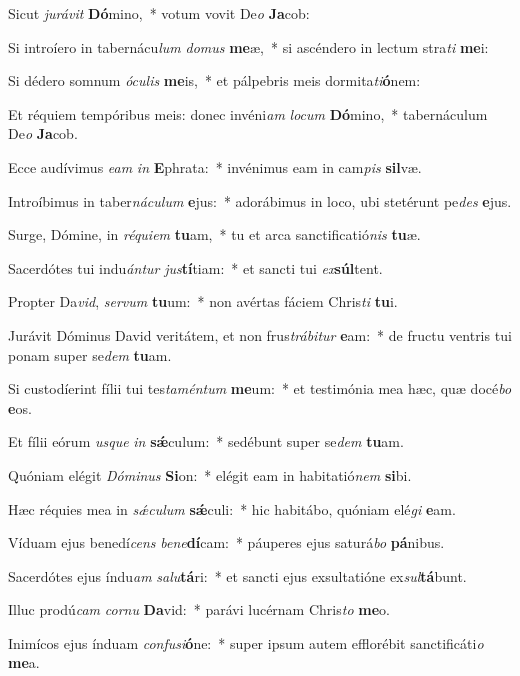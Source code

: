 \item Sicut \textit{ju}\textit{rá}\textit{vit} \textbf{Dó}mino,~* votum vovit De\textit{o} \textbf{Ja}cob:
\item Si introíero in tabernácu\textit{lum} \textit{do}\textit{mus} \textbf{me}æ,~* si ascéndero in lectum stra\textit{ti} \textbf{me}i:
\item Si dédero somnum \textit{ó}\textit{cu}\textit{lis} \textbf{me}is,~* et pálpebris meis dormita\textit{ti}\textbf{ó}nem:
\item Et réquiem tempóribus meis: donec invéni\textit{am} \textit{lo}\textit{cum} \textbf{Dó}mino,~* tabernáculum De\textit{o} \textbf{Ja}cob.
\item Ecce audívimus \textit{e}\textit{am} \textit{in} \textbf{E}phrata:~* invénimus eam in cam\textit{pis} \textbf{sil}væ.
\item Introíbimus in taber\textit{ná}\textit{cu}\textit{lum} \textbf{e}jus:~* adorábimus in loco, ubi stetérunt pe\textit{des} \textbf{e}jus.
\item Surge, Dómine, in \textit{ré}\textit{qui}\textit{em} \textbf{tu}am,~* tu et arca sanctificatió\textit{nis} \textbf{tu}æ.
\item Sacerdótes tui indu\textit{án}\textit{tur} \textit{jus}\textbf{tí}tiam:~* et sancti tui \textit{ex}\textbf{súl}tent.
\item Propter Da\textit{vid}, \textit{ser}\textit{vum} \textbf{tu}um:~* non avértas fáciem Chris\textit{ti} \textbf{tu}i.
\item Jurávit Dóminus David veritátem, et non frus\textit{trá}\textit{bi}\textit{tur} \textbf{e}am:~* de fructu ventris tui ponam super se\textit{dem} \textbf{tu}am.
\item Si custodíerint fílii tui tes\textit{ta}\textit{mén}\textit{tum} \textbf{me}um:~* et testimónia mea hæc, quæ docé\textit{bo} \textbf{e}os.
\item Et fílii eórum \textit{us}\textit{que} \textit{in} \textbf{sǽ}culum:~* sedébunt super se\textit{dem} \textbf{tu}am.
\item Quóniam elégit \textit{Dó}\textit{mi}\textit{nus} \textbf{Si}on:~* elégit eam in habitatió\textit{nem} \textbf{si}bi.
\item Hæc réquies mea in \textit{sǽ}\textit{cu}\textit{lum} \textbf{sǽ}culi:~* hic habitábo, quóniam elé\textit{gi} \textbf{e}am.
\item Víduam ejus benedí\textit{cens} \textit{be}\textit{ne}\textbf{dí}cam:~* páuperes ejus saturá\textit{bo} \textbf{pá}nibus.
\item Sacerdótes ejus índu\textit{am} \textit{sa}\textit{lu}\textbf{tá}ri:~* et sancti ejus exsultatióne ex\textit{sul}\textbf{tá}bunt.
\item Illuc prodú\textit{cam} \textit{cor}\textit{nu} \textbf{Da}vid:~* parávi lucérnam Chris\textit{to} \textbf{me}o.
\item Inimícos ejus índuam \textit{con}\textit{fu}\textit{si}\textbf{ó}ne:~* super ipsum autem efflorébit sanctificáti\textit{o} \textbf{me}a.
